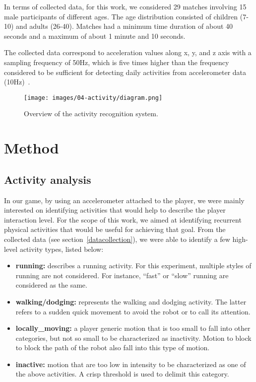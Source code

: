 In terms of collected data, for this work, we considered 29 matches involving 15 male participants of different ages. The age distribution consisted of children (7-10) and adults (26-40). Matches had a minimum time duration of about 40 seconds and a maximum of about 1 minute and 10 seconds. 

The collected data correspond to acceleration values along x, y, and z axis with a sampling frequency of 50Hz, which is five times higher than the frequency considered to be sufficient for detecting daily activities from accelerometer data (10Hz)~\cite{atallah_sensor_2010, ravi_activity_2005, kikhia_analyzing_2014}.

\begin{figure*}[!t]
\normalsize
      \centering
      {\texttt{[image: images/04-activity/diagram.png]}}
      \caption{Overview of the activity recognition system.}
      \label{approach}
\end{figure*}
  
\section{Method}
\subsection{Activity analysis}\label{activityanalysis}

In our game, by using an accelerometer attached to the player, we were mainly interested on identifying activities that would help to describe the player interaction level. For the scope of this work, we aimed at identifying recurrent physical activities that would be useful for achieving that goal. From the collected data (see section~\ref{datacollection}), we were able to identify a few high-level activity types, listed below:

\begin{itemize}
\item  \textbf{running:} describes a running activity. For this experiment, multiple styles of running are not considered. For instance, ``fast'' or ``slow'' running are considered as the same.
\item \textbf{walking/dodging:} represents the walking and dodging activity. The latter refers to a sudden quick movement to avoid the robot or to call its attention.
\item  \textbf{locally\_moving:} a player generic motion that is too small to fall into other categories, but not so small to be characterized as inactivity. Motion to block to block the path of the robot also fall into this type of motion.
\item  \textbf{inactive:} motion that are too low in intensity to be characterized as one of the above activities. A crisp threshold is used to delimit this category. 
\end{itemize}


